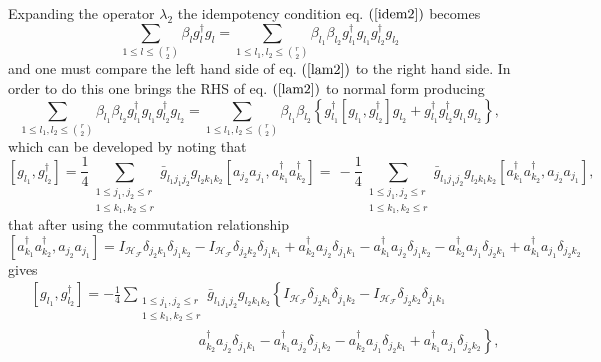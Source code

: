 \documentclass[aps,preprint]{revtex4}%
\begin{document}
Expanding the operator $\lambda_{2}$ the idempotency condition eq. $\left(
\ref{idem2}\right)  $ becomes
\begin{equation}
\sum_{1\leq l\leq\binom{r}{2}}\beta_{l}g_{l}^{\dagger}g_{l}=\sum_{1\leq
l_{1},l_{2}\leq\binom{r}{2}}\beta_{l_{1}}\beta_{l_{2}}g_{l_{1}}^{\dagger
}g_{l_{1}}g_{l_{2}}^{\dagger}g_{l_{2}} \label{lam2}%
\end{equation}
and one must compare the left hand side of eq. $\left(  \ref{lam2}\right)  $
to the right hand side. In order to do this one brings the RHS of eq. $\left(
\ref{lam2}\right)  $ to normal form producing
\begin{equation}
\sum_{1\leq l_{1},l_{2}\leq\binom{r}{2}}\beta_{l_{1}}\beta_{l_{2}}g_{l_{1}%
}^{\dagger}g_{l_{1}}g_{l_{2}}^{\dagger}g_{l_{2}}=\sum_{1\leq l_{1},l_{2}%
\leq\binom{r}{2}}\beta_{l_{1}}\beta_{l_{2}}\left\{  g_{l_{1}}^{\dagger}\left[
g_{l_{1}},g_{l_{2}}^{\dagger}\right]  g_{l_{2}}+g_{l_{1}}^{\dagger}g_{l_{2}%
}^{\dagger}g_{l_{1}}g_{l_{2}}\right\}  , \label{normform}%
\end{equation}
which can be developed by noting that%
\begin{equation}
\left[  g_{l_{1}},g_{l_{2}}^{\dagger}\right]  =\frac{1}{4}\sum
_{\substack{1\leq j_{1},j_{2}\leq r\\1\leq k_{1},k_{2}\leq r}}\bar{g}%
_{l_{1}j_{1}j_{2}}g_{l_{2}k_{1}k_{2}}\left[  a_{j_{2}}a_{j_{1}},a_{k_{1}%
}^{\dagger}a_{k_{2}}^{\dagger}\right]  =\,-\frac{1}{4}\sum_{\substack{1\leq
j_{1},j_{2}\leq r\\1\leq k_{1},k_{2}\leq r}}\bar{g}_{l_{1}j_{1}j_{2}}%
g_{l_{2}k_{1}k_{2}}\left[  a_{k_{1}}^{\dagger}a_{k_{2}}^{\dagger},a_{j_{2}%
}a_{j_{1}}\right]  ,
\end{equation}
that after using the commutation relationship
\begin{equation}
\left[  a_{k_{1}}^{\dagger}a_{k_{2}}^{\dagger},a_{j_{2}}a_{j_{1}}\right]
=I_{\mathcal{H}_{\mathcal{F}}}\delta_{j_{2}k_{1}}\delta_{j_{1}k_{2}%
}-I_{\mathcal{H}_{\mathcal{F}}}\delta_{j_{2}k_{2}}\delta_{j_{1}k_{1}}%
+a_{k_{2}}^{\dagger}a_{j_{2}}\delta_{j_{1}k_{1}}-a_{k_{1}}^{\dagger}a_{j_{2}%
}\delta_{j_{1}k_{2}}-a_{k_{2}}^{\dagger}a_{j_{1}}\delta_{j_{2}k_{1}}+a_{k_{1}%
}^{\dagger}a_{j_{1}}\delta_{j_{2}k_{2}}%
\end{equation}
gives
\begin{align}
&  \left[  g_{l_{1}},g_{l_{2}}^{\dagger}\right]  =-\frac{1}{4}\sum
_{\substack{1\leq j_{1},j_{2}\leq r\\1\leq k_{1},k_{2}\leq r}}\bar{g}%
_{l_{1}j_{1}j_{2}}g_{l_{2}k_{1}k_{2}}\left\{  I_{\mathcal{H}_{\mathcal{F}}%
}\delta_{j_{2}k_{1}}\delta_{j_{1}k_{2}}-I_{\mathcal{H}_{\mathcal{F}}}%
\delta_{j_{2}k_{2}}\delta_{j_{1}k_{1}}\right. \nonumber\\
&  \left.  \qquad\qquad\qquad\qquad\qquad\qquad\right.  \left.  a_{k_{2}%
}^{\dagger}a_{j_{2}}\delta_{j_{1}k_{1}}-a_{k_{1}}^{\dagger}a_{j_{2}}%
\delta_{j_{1}k_{2}}-a_{k_{2}}^{\dagger}a_{j_{1}}\delta_{j_{2}k_{1}}+a_{k_{1}%
}^{\dagger}a_{j_{1}}\delta_{j_{2}k_{2}}\right\}  ,\nonumber
\end{align}
\end{document}
